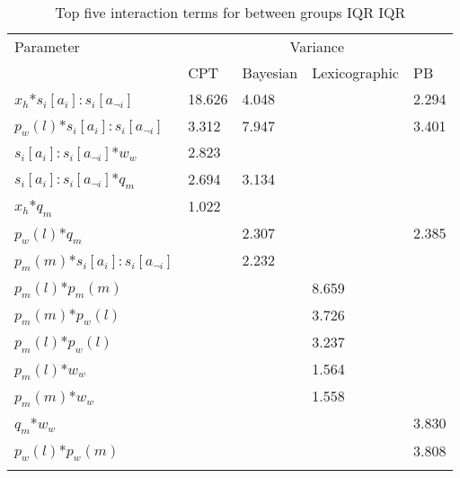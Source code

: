 \begin{table}[H]
\caption{Top five interaction terms for between groups IQR IQR \label{tab:sa_interaction_prospect_group_iqr_iqr}}
\begin{tabular} {lllll}
\hline\noalign{\smallskip}
Parameter & \multicolumn{4}{c}{Variance} \\ 
& \ac{CPT} & Bayesian & Lexicographic & \ac{PB} \\
\noalign{\smallskip}\svhline\noalign{\smallskip}

\(x_{h}\)*\(s_{i}[a_{i}]:s_{i}[a_{\neg i}]\) & 18.626 & 4.048&& 2.294\\
\(p_{w}(l)\)*\(s_{i}[a_{i}]:s_{i}[a_{\neg i}]\) & 3.312 &  7.947 & &  3.401\\
\(s_{i}[a_{i}]:s_{i}[a_{\neg i}]\)*\(w_{w}\) & 2.823\\
\(s_{i}[a_{i}]:s_{i}[a_{\neg i}]\)*\(q_{m}\) & 2.694 & 3.134\\
\(x_{h}\)*\(q_{m}\) & 1.022\\
\(p_{w}(l)\)*\(q_{m}\) && 2.307 && 2.385\\
\(p_{m}(m)\)*\(s_{i}[a_{i}]:s_{i}[a_{\neg i}]\) && 2.232\\
\(p_{m}(l)\)*\(p_{m}(m)\) &&& 8.659\\
\(p_{m}(m)\)*\(p_{w}(l)\) &&& 3.726\\
\(p_{m}(l)\)*\(p_{w}(l)\) &&& 3.237\\
\(p_{m}(l)\)*\(w_{w}\) &&& 1.564\\
\(p_{m}(m)\)*\(w_{w}\) &&& 1.558\\
\(q_{m}\)*\(w_{w}\) &&&& 3.830\\
\(p_{w}(l)\)*\(p_{w}(m)\) &&&& 3.808\\
\noalign{\smallskip}\hline\noalign{\smallskip}
\end{tabular}
\end{table}
